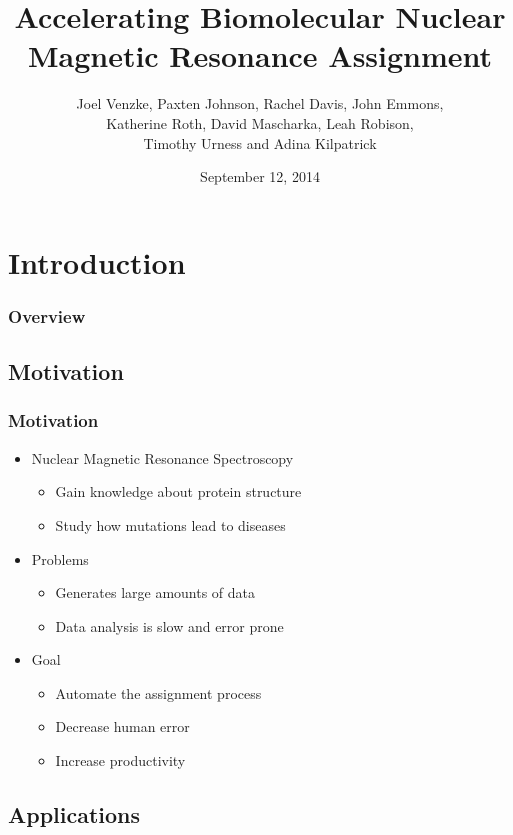 \documentclass{beamer}
\title[NMR Assignment]{Accelerating Biomolecular Nuclear Magnetic Resonance Assignment} %
\author[J. Venzke, P. Johnson, R. Davis, J. Emmons, K. Roth, D. Mascharka, L. Robison, T. Urness, A. Kilpatrick]{Joel Venzke, Paxten Johnson, Rachel Davis, John Emmons,\\ Katherine Roth, David Mascharka, Leah Robison,\\ Timothy Urness and Adina Kilpatrick} %
\institute[Drake University] %
{
Department of Mathematics and Computer Science\\
Drake University\\

\medskip
\textit{joel.venzke@drake.edu} %
}
\date{September 12, 2014} %
\begin{document}
\begin{frame}
\titlepage %
\end{frame}

\section{Introduction}
\begin{frame}
\frametitle{Overview} %
\tableofcontents 
\end{frame}

\subsection{Motivation} 
\begin{frame}
	\frametitle{Motivation}
	\begin{itemize}
		\item Nuclear Magnetic Resonance Spectroscopy
		\begin{itemize}
			\item Gain knowledge about protein structure
			\item Study how mutations lead to diseases
		\end{itemize}
		\item Problems
		\begin{itemize}
			\item Generates large amounts of data
			\item Data analysis is slow and error prone 
		\end{itemize}
		\item Goal
		\begin{itemize}
			\item Automate the assignment process
			\item Decrease human error
			\item Increase productivity
		\end{itemize}
	\end{itemize}
\end{frame}

\subsection{Applications}
\end{document}
